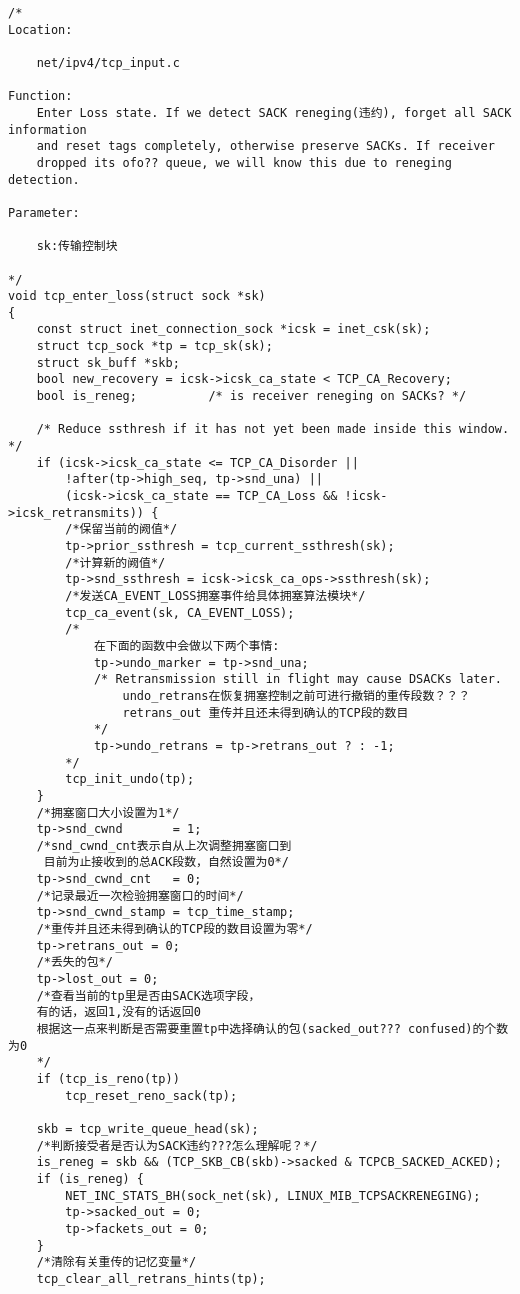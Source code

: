\begin{verbatim}
/*
Location:

	net/ipv4/tcp_input.c

Function: 
	Enter Loss state. If we detect SACK reneging(违约), forget all SACK information
	and reset tags completely, otherwise preserve SACKs. If receiver
	dropped its ofo?? queue, we will know this due to reneging detection.

Parameter:

	sk:传输控制块

*/
void tcp_enter_loss(struct sock *sk)
{
	const struct inet_connection_sock *icsk = inet_csk(sk);
	struct tcp_sock *tp = tcp_sk(sk);
	struct sk_buff *skb;
	bool new_recovery = icsk->icsk_ca_state < TCP_CA_Recovery;
	bool is_reneg;			/* is receiver reneging on SACKs? */

	/* Reduce ssthresh if it has not yet been made inside this window. */
	if (icsk->icsk_ca_state <= TCP_CA_Disorder ||
	    !after(tp->high_seq, tp->snd_una) ||
	    (icsk->icsk_ca_state == TCP_CA_Loss && !icsk->icsk_retransmits)) {
		/*保留当前的阙值*/		
		tp->prior_ssthresh = tcp_current_ssthresh(sk);
		/*计算新的阙值*/		
		tp->snd_ssthresh = icsk->icsk_ca_ops->ssthresh(sk);
		/*发送CA_EVENT_LOSS拥塞事件给具体拥塞算法模块*/		
		tcp_ca_event(sk, CA_EVENT_LOSS);
		/*
			在下面的函数中会做以下两个事情:
			tp->undo_marker = tp->snd_una;
			/* Retransmission still in flight may cause DSACKs later. 
				undo_retrans在恢复拥塞控制之前可进行撤销的重传段数？？？
				retrans_out 重传并且还未得到确认的TCP段的数目
			*/
			tp->undo_retrans = tp->retrans_out ? : -1;
		*/
		tcp_init_undo(tp);
	}
	/*拥塞窗口大小设置为1*/
	tp->snd_cwnd	   = 1;
	/*snd_cwnd_cnt表示自从上次调整拥塞窗口到
	 目前为止接收到的总ACK段数，自然设置为0*/
	tp->snd_cwnd_cnt   = 0;
	/*记录最近一次检验拥塞窗口的时间*/
	tp->snd_cwnd_stamp = tcp_time_stamp;
	/*重传并且还未得到确认的TCP段的数目设置为零*/
	tp->retrans_out = 0;
	/*丢失的包*/
	tp->lost_out = 0;
	/*查看当前的tp里是否由SACK选项字段，
	有的话，返回1,没有的话返回0
	根据这一点来判断是否需要重置tp中选择确认的包(sacked_out??? confused)的个数为0
	*/
	if (tcp_is_reno(tp))
		tcp_reset_reno_sack(tp);
	
	skb = tcp_write_queue_head(sk);
	/*判断接受者是否认为SACK违约???怎么理解呢？*/
	is_reneg = skb && (TCP_SKB_CB(skb)->sacked & TCPCB_SACKED_ACKED);
	if (is_reneg) {
		NET_INC_STATS_BH(sock_net(sk), LINUX_MIB_TCPSACKRENEGING);
		tp->sacked_out = 0;
		tp->fackets_out = 0;
	}
	/*清除有关重传的记忆变量*/
	tcp_clear_all_retrans_hints(tp);


\end{verbatim}
